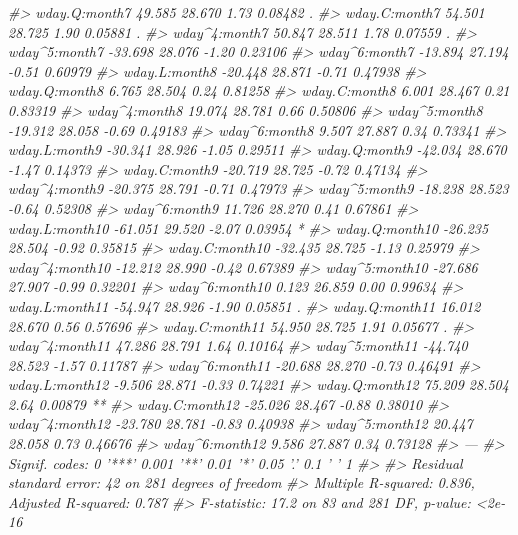 \documentclass[]{book}
\newenvironment{Shaded}{\begin{snugshade}}{\end{snugshade}}
\newcommand{\CommentTok}[1]{\textcolor[rgb]{0.56,0.35,0.01}{\textit{#1}}}
\theoremstyle{plain}
\theoremstyle{remark}
\begin{document}
\begin{Shaded}
\begin{Highlighting}[]
\CommentTok{#> wday.Q:month7    49.585     28.670    1.73  0.08482 .  }
\CommentTok{#> wday.C:month7    54.501     28.725    1.90  0.05881 .  }
\CommentTok{#> wday^4:month7    50.847     28.511    1.78  0.07559 .  }
\CommentTok{#> wday^5:month7   -33.698     28.076   -1.20  0.23106    }
\CommentTok{#> wday^6:month7   -13.894     27.194   -0.51  0.60979    }
\CommentTok{#> wday.L:month8   -20.448     28.871   -0.71  0.47938    }
\CommentTok{#> wday.Q:month8     6.765     28.504    0.24  0.81258    }
\CommentTok{#> wday.C:month8     6.001     28.467    0.21  0.83319    }
\CommentTok{#> wday^4:month8    19.074     28.781    0.66  0.50806    }
\CommentTok{#> wday^5:month8   -19.312     28.058   -0.69  0.49183    }
\CommentTok{#> wday^6:month8     9.507     27.887    0.34  0.73341    }
\CommentTok{#> wday.L:month9   -30.341     28.926   -1.05  0.29511    }
\CommentTok{#> wday.Q:month9   -42.034     28.670   -1.47  0.14373    }
\CommentTok{#> wday.C:month9   -20.719     28.725   -0.72  0.47134    }
\CommentTok{#> wday^4:month9   -20.375     28.791   -0.71  0.47973    }
\CommentTok{#> wday^5:month9   -18.238     28.523   -0.64  0.52308    }
\CommentTok{#> wday^6:month9    11.726     28.270    0.41  0.67861    }
\CommentTok{#> wday.L:month10  -61.051     29.520   -2.07  0.03954 *  }
\CommentTok{#> wday.Q:month10  -26.235     28.504   -0.92  0.35815    }
\CommentTok{#> wday.C:month10  -32.435     28.725   -1.13  0.25979    }
\CommentTok{#> wday^4:month10  -12.212     28.990   -0.42  0.67389    }
\CommentTok{#> wday^5:month10  -27.686     27.907   -0.99  0.32201    }
\CommentTok{#> wday^6:month10    0.123     26.859    0.00  0.99634    }
\CommentTok{#> wday.L:month11  -54.947     28.926   -1.90  0.05851 .  }
\CommentTok{#> wday.Q:month11   16.012     28.670    0.56  0.57696    }
\CommentTok{#> wday.C:month11   54.950     28.725    1.91  0.05677 .  }
\CommentTok{#> wday^4:month11   47.286     28.791    1.64  0.10164    }
\CommentTok{#> wday^5:month11  -44.740     28.523   -1.57  0.11787    }
\CommentTok{#> wday^6:month11  -20.688     28.270   -0.73  0.46491    }
\CommentTok{#> wday.L:month12   -9.506     28.871   -0.33  0.74221    }
\CommentTok{#> wday.Q:month12   75.209     28.504    2.64  0.00879 ** }
\CommentTok{#> wday.C:month12  -25.026     28.467   -0.88  0.38010    }
\CommentTok{#> wday^4:month12  -23.780     28.781   -0.83  0.40938    }
\CommentTok{#> wday^5:month12   20.447     28.058    0.73  0.46676    }
\CommentTok{#> wday^6:month12    9.586     27.887    0.34  0.73128    }
\CommentTok{#> ---}
\CommentTok{#> Signif. codes:  0 '***' 0.001 '**' 0.01 '*' 0.05 '.' 0.1 ' ' 1}
\CommentTok{#> }
\CommentTok{#> Residual standard error: 42 on 281 degrees of freedom}
\CommentTok{#> Multiple R-squared:  0.836,  Adjusted R-squared:  0.787 }
\CommentTok{#> F-statistic: 17.2 on 83 and 281 DF,  p-value: <2e-16}
\end{Highlighting}
\end{Shaded}
\end{document}
